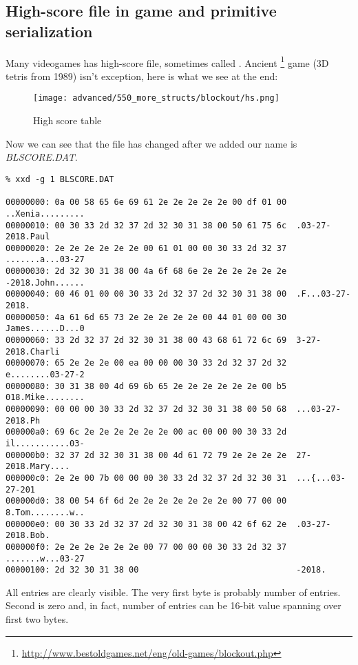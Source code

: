\subsection{High-score file in  game and primitive serialization}

Many videogames has high-score file, sometimes called .
Ancient \footnote{\url{http://www.bestoldgames.net/eng/old-games/blockout.php}} game
(3D tetris from 1989) isn't exception, here is what we see at the end:

\begin{figure}[H]
\centering
\texttt{[image: advanced/550\_more\_structs/blockout/hs.png]}
\caption{High score table}
\end{figure}

Now we can see that the file has changed after we added our name is \emph{BLSCORE.DAT}.
\begin{lstlisting}
% xxd -g 1 BLSCORE.DAT

00000000: 0a 00 58 65 6e 69 61 2e 2e 2e 2e 2e 00 df 01 00  ..Xenia.........
00000010: 00 30 33 2d 32 37 2d 32 30 31 38 00 50 61 75 6c  .03-27-2018.Paul
00000020: 2e 2e 2e 2e 2e 2e 00 61 01 00 00 30 33 2d 32 37  .......a...03-27
00000030: 2d 32 30 31 38 00 4a 6f 68 6e 2e 2e 2e 2e 2e 2e  -2018.John......
00000040: 00 46 01 00 00 30 33 2d 32 37 2d 32 30 31 38 00  .F...03-27-2018.
00000050: 4a 61 6d 65 73 2e 2e 2e 2e 2e 00 44 01 00 00 30  James......D...0
00000060: 33 2d 32 37 2d 32 30 31 38 00 43 68 61 72 6c 69  3-27-2018.Charli
00000070: 65 2e 2e 2e 00 ea 00 00 00 30 33 2d 32 37 2d 32  e........03-27-2
00000080: 30 31 38 00 4d 69 6b 65 2e 2e 2e 2e 2e 2e 00 b5  018.Mike........
00000090: 00 00 00 30 33 2d 32 37 2d 32 30 31 38 00 50 68  ...03-27-2018.Ph
000000a0: 69 6c 2e 2e 2e 2e 2e 2e 00 ac 00 00 00 30 33 2d  il...........03-
000000b0: 32 37 2d 32 30 31 38 00 4d 61 72 79 2e 2e 2e 2e  27-2018.Mary....
000000c0: 2e 2e 00 7b 00 00 00 30 33 2d 32 37 2d 32 30 31  ...{...03-27-201
000000d0: 38 00 54 6f 6d 2e 2e 2e 2e 2e 2e 2e 00 77 00 00  8.Tom........w..
000000e0: 00 30 33 2d 32 37 2d 32 30 31 38 00 42 6f 62 2e  .03-27-2018.Bob.
000000f0: 2e 2e 2e 2e 2e 2e 00 77 00 00 00 30 33 2d 32 37  .......w...03-27
00000100: 2d 32 30 31 38 00                                -2018.
\end{lstlisting}

All entries are clearly visible.
The very first byte is probably number of entries.
Second is zero and, in fact, number of entries can be 16-bit value spanning over first two bytes.

